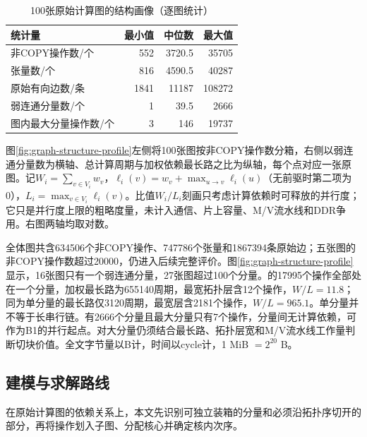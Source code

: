 \begin{table}[H]\centering\small
\caption{100张原始计算图的结构画像（逐图统计）}\label{tab:q1-graph-profile}
\begin{tabular}{lrrr}\toprule
统计量 & 最小值 & 中位数 & 最大值\\\midrule
非COPY操作数/个 & 552 & 3720.5 & 35705\\
张量数/个 & 816 & 4590.5 & 40287\\
原始有向边数/条 & 1841 & 11187 & 108272\\
弱连通分量数/个 & 1 & 39.5 & 2666\\
图内最大分量操作数/个 & 3 & 146 & 19737\\\bottomrule
\end{tabular}\end{table}

图\ref{fig:graph-structure-profile}左侧将100张图按非COPY操作数分箱，右侧以弱连通分量数为横轴、总计算周期与加权依赖最长路之比为纵轴，每个点对应一张原图。记$W_i=\sum_{v\in V_i}w_v$，$\ell_i(v)=w_v+\max_{u\to v}\ell_i(u)$（无前驱时第二项为0），$L_i=\max_{v\in V_i}\ell_i(v)$。比值$W_i/L_i$刻画只考虑计算依赖时可释放的并行度；它只是并行度上限的粗略度量，未计入通信、片上容量、M/V流水线和DDR争用。右图两轴均取对数。

全体图共含634506个非COPY操作、747786个张量和1867394条原始边；五张图的非COPY操作数超过20000，仍进入后续完整评价。图\ref{fig:graph-structure-profile}显示，16张图只有一个弱连通分量，27张图超过100个分量。的17995个操作全部处在一个分量，加权最长路为655140周期，最宽拓扑层含12个操作，$W/L=11.8$；同为单分量的最长路仅3120周期，最宽层含2181个操作，$W/L=965.1$。单分量并不等于长串行链。有2666个分量且最大分量只有7个操作，分量间无计算依赖，可作为B1的并行起点。对大分量仍须结合最长路、拓扑层宽和M/V流水线工作量判断切块价值。全文字节量以B计，时间以cycle计，1 MiB $=2^{20}$ B。

\subsection{建模与求解路线}
在原始计算图的依赖关系上，本文先识别可独立装箱的分量和必须沿拓扑序切开的部分，再将操作划入子图、分配核心并确定核内次序。

